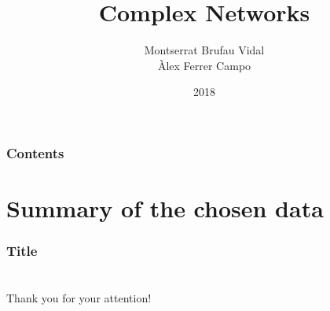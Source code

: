\documentclass{beamer}
\title[]{Complex Networks}
\author[]{Montserrat Brufau Vidal\\ Àlex Ferrer Campo}
\institute[]{Universitat de Barcelona}
\date{2018}
\theoremstyle{plain}
\theoremstyle{definition}
\theoremstyle{remark}
\begin{document}
\begin{frame}
\titlepage
\end{frame}

\begin{frame}
\frametitle{Contents}
\tableofcontents
\end{frame}


\section{Summary of the chosen data}


\begin{frame}
\frametitle{Title}


\end{frame}



\section*{}
\begin{frame}

\centering
\Huge{Thank you for your attention!}

\end{frame}

\end{document}
